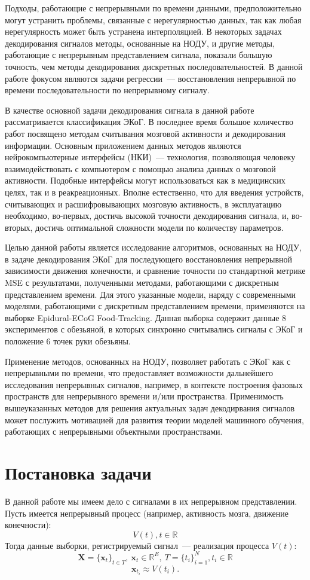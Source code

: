 \documentclass[a4paper, 12pt]{article} %
\newcommand{\x}{\mathbf{x}}
\newcommand{\X}{\mathbf{X}}
\newcommand{\R}{\mathbb{R}}
\begin{document}
Подходы, работающие с непрерывными по времени данными, предположительно могут устранить проблемы, связанные с нерегулярностью данных, так как любая нерегулярность может быть устранена интерполяцией. В некоторых задачах декодирования сигналов методы, основанные на НОДУ, и другие методы, работающие с непрерывным представлением сигнала, показали большую точность, чем методы декодирования дискретных последовательностей. В данной работе фокусом являются задачи регрессии~--- восстановления непрерывной по времени последовательности по непрерывному сигналу.

В качестве основной задачи декодирования сигнала в данной работе рассматривается классификация ЭКоГ. В последнее время большое количество работ посвящено методам считывания мозговой активности и декодирования информации. Основным приложением данных методов являются нейрокомпьютерные интерфейсы (НКИ)~--- технология, позволяющая человеку взаимодействовать с компьютером с помощью анализа данных о мозговой активности. Подобные интерфейсы могут использоваться как в медицинских целях, так и в реакреационных. Вполне естественно, что для введения устройств, считывающих и расшифровывающих мозговую активность, в эксплуатацию необходимо, во-первых, достичь высокой точности декодирования сигнала, и, во-вторых, достичь оптимальной сложности модели по количеству параметров.

Целью данной работы является исследование алгоритмов, основанных на НОДУ, в задаче декодирования ЭКоГ для последующего восстановления непрерывной зависимости движения конечности, и сравнение точности по стандартной метрике MSE с результатами, полученными методами, работающими с дискретным представлением времени. Для этого указанные модели, наряду с современными моделями, работающими с дискретным представлением времени, применяются на выборке Epidural-ECoG Food-Tracking. Данная выборка содержит данные 8 экспериментов с обезьяной, в которых синхронно считывались сигналы с ЭКоГ и положение 6 точек руки обезьяны.

Применение методов, основанных на НОДУ, позволяет работать с ЭКоГ как с непрерывными по времени, что предоставляет возможности дальнейшего исследования непрерывных сигналов, например, в контексте построения фазовых пространств для непрерывного времени и/или пространства. Применимость вышеуказанных методов для решения актуальных задач декодирвания сигналов может послужить мотивацией для развития теории моделей машинного обучения, работающих с непрерывными объектными пространствами.


\section{Постановка задачи}
В данной работе мы имеем дело с сигналами в их непрерывном представлении. Пусть имеется непрерывный процесс (например, активность мозга, движение конечности):
$$V(t), t \in \R$$
Тогда данные выборки, регистрируемый сигнал~--- реализация процесса $V(t)$:
$$\X = \{\x_t\}_{t\in T},\  \x_t \in \R^E,\  T = \{t_i\}_{i=1}^{N}, t_i \in \R$$ 
$$\x_{t_i} \approx V(t_i).$$
\end{document}
